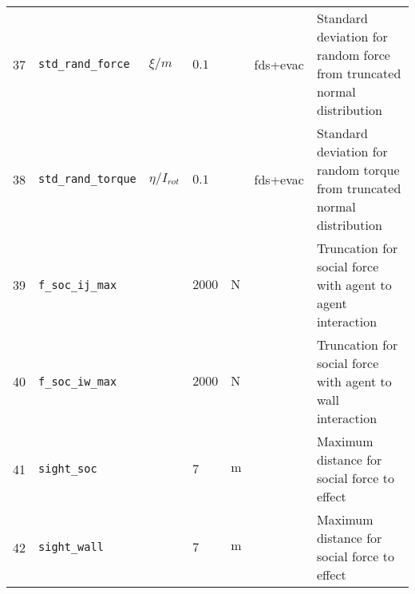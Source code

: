 \begin{tabular}{lllllll}
37 &  \verb|std_rand_force| &  $\xi / m$ &  $0.1$ &   &  fds+evac &  Standard deviation for random force from truncated normal distribution \\
38 &  \verb|std_rand_torque| &  $\eta / I_{rot}$ &  $0.1$ &   &  fds+evac &  Standard deviation for random torque from truncated normal distribution \\
39 &  \verb|f_soc_ij_max| &   &  $2000$ &  $\mathrm{N}$ &   &  Truncation for social force with agent to agent interaction \\
40 &  \verb|f_soc_iw_max| &   &  $2000$ &  $\mathrm{N}$ &   &  Truncation for social force with agent to wall interaction \\
41 &  \verb|sight_soc| &   &  $7$ &  $\mathrm{m}$ &   &  Maximum distance for social force to effect \\
42 &  \verb|sight_wall| &   &  $7$ &  $\mathrm{m}$ &   &  Maximum distance for social force to effect \\
\bottomrule
\end{tabular}
